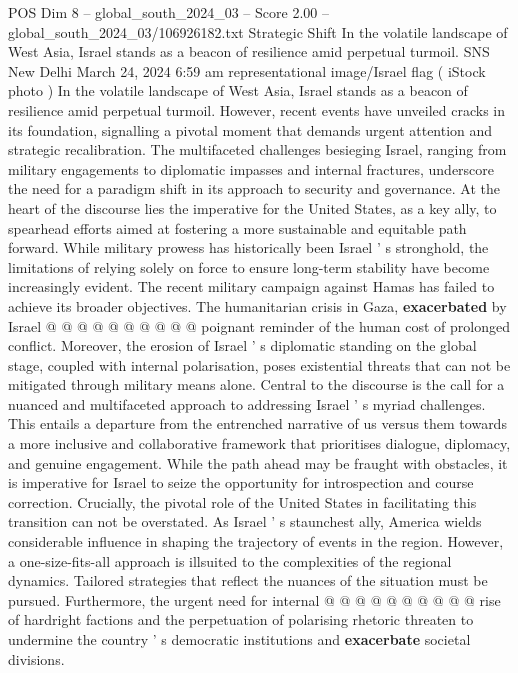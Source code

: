 \begin{textsample}{POS Dim 8 – global\_south\_2024\_03 – Score 2.00 – global\_south\_2024\_03/106926182.txt}  \label{ex:f8_pos_425}
Strategic Shift In the volatile landscape of West Asia, Israel stands as a beacon of resilience amid perpetual turmoil.
SNS New Delhi March 24, 2024 6:59 am representational image/Israel flag ( iStock photo ) In the volatile landscape of West Asia, Israel stands as a beacon of resilience amid perpetual turmoil.
However, recent events have unveiled cracks in its foundation, signalling a pivotal moment that demands urgent attention and strategic recalibration.
The multifaceted challenges besieging Israel, ranging from military engagements to diplomatic impasses and internal fractures, underscore the need for a paradigm shift in its approach to security and governance.
At the heart of the discourse lies the imperative for the United States, as a key ally, to spearhead efforts aimed at fostering a more sustainable and equitable path forward.
While military prowess has historically been Israel ' s stronghold, the limitations of relying solely on force to ensure long-term stability have become increasingly evident.
The recent military campaign against Hamas has failed to achieve its broader objectives.
The humanitarian crisis in Gaza, \textbf{exacerbated} by Israel @ @ @ @ @ @ @ @ @ @ poignant reminder of the human cost of prolonged conflict.
Moreover, the erosion of Israel ' s diplomatic standing on the global stage, coupled with internal polarisation, poses existential threats that can not be mitigated through military means alone.
Central to the discourse is the call for a nuanced and multifaceted approach to addressing Israel ' s myriad challenges.
This entails a departure from the entrenched narrative of us versus them towards a more inclusive and collaborative framework that prioritises dialogue, diplomacy, and genuine engagement.
While the path ahead may be fraught with obstacles, it is imperative for Israel to seize the opportunity for introspection and course correction.
Crucially, the pivotal role of the United States in facilitating this transition can not be overstated.
As Israel ' s staunchest ally, America wields considerable influence in shaping the trajectory of events in the region.
However, a one-size-fits-all approach is illsuited to the complexities of the regional dynamics.
Tailored strategies that reflect the nuances of the situation must be pursued.
Furthermore, the urgent need for internal @ @ @ @ @ @ @ @ @ @ rise of hardright factions and the perpetuation of polarising rhetoric threaten to undermine the country ' s democratic institutions and \textbf{exacerbate} societal divisions.

\end{textsample}
